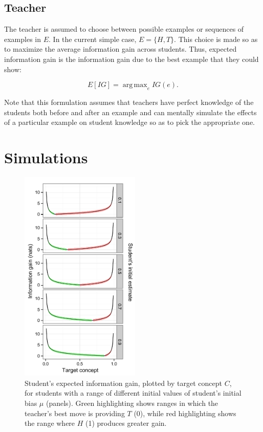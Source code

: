 \documentclass[10pt,letterpaper]{article}
\DeclareMathOperator*{\argmax}{arg\,max}
\begin{document}
\subsection{Teacher}

The teacher is assumed to choose between possible examples or sequences of examples in $E$. In the current simple case, $E=\{H,T\}$. This choice is made so as to maximize the average information gain across students. Thus, expected information gain is the information gain due to the best example that they could show:

\begin{equation}
E[IG] = \argmax_e {IG(e)}.
\end{equation}

\noindent Note that this formulation assumes that teachers have perfect knowledge of the students both before and after an example and can mentally simulate the effects of a particular example on student knowledge so as to pick the appropriate one. 

 \section{Simulations}

\begin{figure}[t]
\begin{center}
\includegraphics[width=2.25in]{figures/single_student_gain.pdf}
\end{center}
\vspace{-2ex}
\caption{\label{fig:student} Student's expected information gain, plotted by target concept $C$, for students with a range of different initial values of student's initial bias $\mu$ (panels). Green highlighting shows ranges in which the teacher's best move is providing $T$ (0), while red highlighting shows the range where $H$ (1) produces greater gain.}
\vspace{-2ex}
\end{figure}
\end{document}
